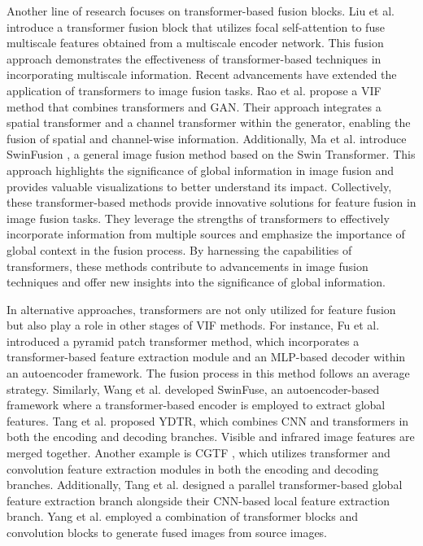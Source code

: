 Another line of research focuses on transformer-based fusion blocks. Liu et al. \cite{liu2022mfst} introduce a transformer fusion block that utilizes focal self-attention to fuse multiscale features obtained from a multiscale encoder network. This fusion approach demonstrates the effectiveness of transformer-based techniques in incorporating multiscale information. Recent advancements have extended the application of transformers to image fusion tasks. Rao et al. \cite{rao2023tgfuse} propose a VIF method that combines transformers and GAN. Their approach integrates a spatial transformer and a channel transformer within the generator, enabling the fusion of spatial and channel-wise information. Additionally, Ma et al. introduce SwinFusion \cite{ma2022swinfusion}, a general image fusion method based on the Swin Transformer. This approach highlights the significance of global information in image fusion and provides valuable visualizations to better understand its impact. Collectively, these transformer-based methods provide innovative solutions for feature fusion in image fusion tasks. They leverage the strengths of transformers to effectively incorporate information from multiple sources and emphasize the importance of global context in the fusion process. By harnessing the capabilities of transformers, these methods contribute to advancements in image fusion techniques and offer new insights into the significance of global information.


In alternative approaches, transformers are not only utilized for feature fusion but also play a role in other stages of VIF methods. For instance, Fu et al.\cite{fu2021ppt} introduced a pyramid patch transformer method, which incorporates a transformer-based feature extraction module and an MLP-based decoder within an autoencoder framework. The fusion process in this method follows an average strategy. Similarly, Wang et al. \cite{wang2022swinfuse} developed SwinFuse, an autoencoder-based framework where a transformer-based encoder is employed to extract global features. Tang et al. \cite{tang2022ydtr} proposed YDTR, which combines CNN and transformers in both the encoding and decoding branches. Visible and infrared image features are merged together. Another example is CGTF \cite{wang2022unsupervised}, which utilizes transformer and convolution feature extraction modules in both the encoding and decoding branches. Additionally, Tang et al. \cite{tang2023tccfusion} designed a parallel transformer-based global feature extraction branch alongside their CNN-based local feature extraction branch. Yang et al. \cite{yang2023dglt} employed a combination of transformer blocks and convolution blocks to generate fused images from source images.

